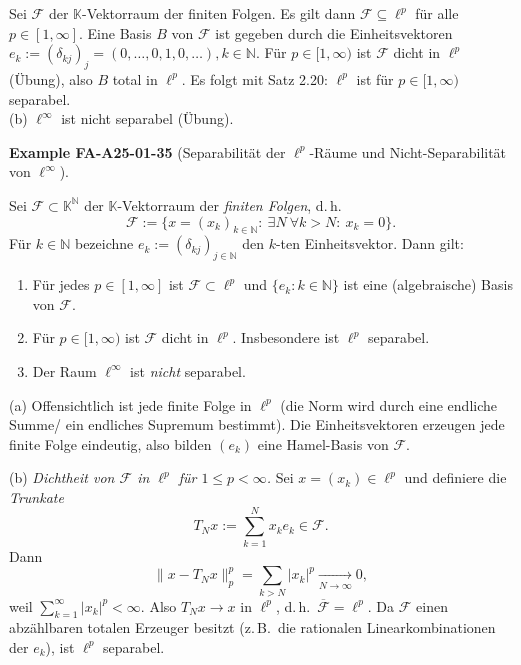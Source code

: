 \documentclass[10pt, letterpaper]{article}
\newcommand{\CustomHeading}[3]{%
  \par\medskip\noindent%
  \textbf{#1 #2} \textnormal{(#3)}.\enskip%
}
\newenvironment{EXA}[2]{\begin{unitbox}\CustomHeading{Example}{#1}{#2}}{\end{unitbox}}
\begin{document}
Sei $\mathcal{F}$ der $\mathbb{K}$-Vektorraum der finiten Folgen. Es gilt dann $\mathcal{F} \subseteq \ell^{p}$ für alle $p \in[1, \infty]$. Eine Basis $B$ von $\mathcal{F}$ ist gegeben durch die Einheitsvektoren $e_{k}:=\left(\delta_{k j}\right)_{j}=(0, \ldots, 0,1,0, \ldots), k \in \mathbb{N}$. Für $p \in[1, \infty)$ ist $\mathcal{F}$ dicht in $\ell^{p}$ (Übung), also $B$ total in $\ell^{p}$. Es folgt mit Satz 2.20: $\ell^{p}$ ist für $p \in[1, \infty)$ separabel.\\
(b) $\ell^{\infty}$ ist nicht separabel (Übung).





\begin{EXA}{FA-A25-01-35}{Separabilität der $\ell^{p}$-Räume und Nicht-Separabilität von $\ell^{\infty}$}
Sei $\mathcal{F}\subset \mathbb{K}^{\mathbb{N}}$ der $\mathbb{K}$-Vektorraum der \emph{finiten Folgen}, d.\,h.
\[
\mathcal{F}:=\{x=(x_k)_{k\in\mathbb{N}}:\ \exists N\ \forall k>N:\ x_k=0\}.
\]
Für $k\in\mathbb{N}$ bezeichne $e_k:=(\delta_{kj})_{j\in\mathbb{N}}$ den $k$-ten Einheitsvektor.
Dann gilt:

\begin{enumerate}[label=(\alph*)]
\item Für jedes $p\in[1,\infty]$ ist $\mathcal{F}\subset \ell^{p}$ und $\{e_k:k\in\mathbb{N}\}$ ist eine (algebraische) Basis von $\mathcal{F}$.

\item Für $p\in[1,\infty)$ ist $\mathcal{F}$ dicht in $\ell^{p}$. Insbesondere ist $\ell^{p}$ separabel.

\item Der Raum $\ell^{\infty}$ ist \emph{nicht} separabel.
\end{enumerate}

(a) Offensichtlich ist jede finite Folge in $\ell^{p}$ (die Norm wird durch eine endliche Summe/ ein endliches Supremum bestimmt).  
Die Einheitsvektoren erzeugen jede finite Folge eindeutig, also bilden $(e_k)$ eine Hamel-Basis von $\mathcal{F}$.

\smallskip
(b) \emph{Dichtheit von $\mathcal{F}$ in $\ell^{p}$ für $1\le p<\infty$.}
Sei $x=(x_k)\in \ell^{p}$ und definiere die \emph{Trunkate}
\[
T_N x := \sum_{k=1}^{N} x_k e_k\in \mathcal{F}.
\]
Dann
\[
\|x-T_Nx\|_{p}^{p}=\sum_{k>N}|x_k|^{p}\xrightarrow[N\to\infty]{}0,
\]
weil $\sum_{k=1}^{\infty}|x_k|^{p}<\infty$. Also $T_Nx\to x$ in $\ell^{p}$, d.\,h.\ $\overline{\mathcal{F}}=\ell^{p}$.  
Da $\mathcal{F}$ einen abzählbaren totalen Erzeuger besitzt (z.\,B.\ die rationalen Linearkombinationen der $e_k$), ist $\ell^{p}$ separabel.


\end{EXA}
\end{document}
